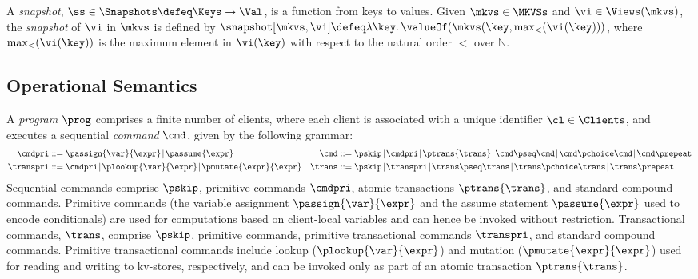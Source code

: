 \begin{definition}[Snapshots]
\label{def:heaps}
\label{def:snapshot}
A \emph{snapshot}, \( \ss \in \Snapshots  \defeq \Keys \to
\Val\),  is a function  from keys to values.
Given $\mkvs \in \MKVSs$ and $\vi \in \Views(\mkvs)$, the \emph{snapshot} of $\vi$ in 
$\mkvs$ is defined by  $\snapshot[\mkvs, \vi] \defeq \lambda \key \ldotp \valueOf(\mkvs(\key, \max_{<}(\vi(\key)))$, 
where $\max_{<}(\vi(\key))$ is the maximum element in $\vi(\key)$ with respect to the natural 
order $<$ over $\mathbb{N}$.
\end{definition}


\subsection{Operational Semantics}

A \emph{program} \( \prog \) comprises a finite number of clients,
where each client is associated with a unique identifier \( \cl \in \Clients \), 
and executes a sequential \emph{command} $\cmd$, given by the following grammar:%
%
{\small%
\begin{align*}
\cmdpri & ::=  
\passign{\var}{\expr} \!\mid\! 
\passume{\expr} 
&
\cmd & ::=  
\pskip \!\mid\!
\cmdpri \!\mid\!  
\ptrans{\trans} \!\mid\! 
\cmd \pseq \cmd \!\mid\! 
\cmd \pchoice \cmd \!\mid\! 
\cmd \prepeat  
\\
\transpri & ::= 
\cmdpri \!\mid\!
\plookup{\var}{\expr} \!\mid\!
\pmutate{\expr}{\expr} 
&
\trans & ::=
\pskip \!\mid\!
\transpri \!\mid\! 
\trans \pseq \trans \!\mid\!
\trans \pchoice \trans \!\mid\!
\trans\prepeat    
\end{align*}%
}%
%
%
Sequential commands  comprise $\pskip$,  primitive commands $\cmdpri
$, atomic transactions
$\ptrans{\trans}$,  and standard
compound commands. 
Primitive commands (the variable assignment
$\passign{\var}{\expr}$ and the assume statement $\passume{\expr}$
used to encode conditionals) are used for computations based on 
client-local variables 
and can hence be invoked without restriction. 
Transactional commands, $\trans$, 
comprise $\pskip$, primitive commands, 
primitive transactional commands $\transpri$,  and standard compound commands. 
Primitive transactional commands include lookup ($\plookup{\var}{\expr}$) and mutation 
($\pmutate{\expr}{\expr}$) used for reading and writing to kv-stores, respectively, and  
can be invoked only as part of an atomic transaction $\ptrans{\trans}$.

